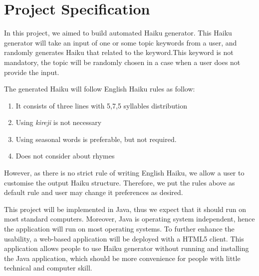 

\section{Project Specification}


In this project, we aimed to build automated Haiku generator. This Haiku generator will take an input of one or some topic keywords from a user, and randomly generates Haiku that related to the keyword.This keyword is not mandatory, the topic will be randomly chosen in a case when a user does not provide the input.


The generated Haiku will follow English Haiku rules as follow:

\begin{enumerate}

\item It consists of three lines with 5,7,5 syllables distribution

\item Using \textit{kireji} is not necessary

\item Using seasonal words is preferable, but not required.

\item Does not consider about rhymes

\end{enumerate}


However, as there is no strict rule of writing English Haiku, we allow a user to customise the output Haiku structure. Therefore, we put the rules above as default rule and user may change it preferences as desired. 

This project will be implemented in Java, thus we expect that it should run on most standard computers. Moreover, Java is operating system independent, hence the application will run on most operating systems. To further enhance the usability, a web-based application will be deployed with a HTML5 client. This application allows people to use Haiku generator without running and installing the Java application, which should be more convenience for people with little technical and computer skill.